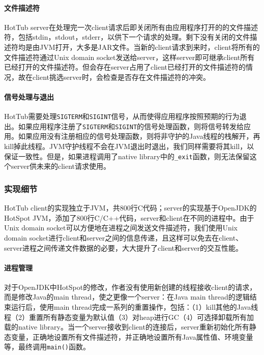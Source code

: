 \documentclass[lang=cn,12pt,a4paper,cite=authoryear]{elegantpaper}
\begin{document}
\begin{figure*}[!htp]
\paragraph{文件描述符}
HotTub server在处理完一次client请求后即关闭所有由应用程序打开的的文件描述符，包括stdin，stdout，stderr，以供下一个请求的处理。剩下没有关闭的文件描述符均是由JVM打开，大多是JAR文件。当新的client请求到来时，client将所有的文件描述符通过Unix domain socket发送给server，这样server即可继承client所有已经打开的文件描述符。但会存在server占用了client已经打开的文件描述符的情况，故在client挑选server时，会检查是否存在文件描述符的冲突。

\paragraph{信号处理与退出}
HotTub需要处理\texttt{SIGTERM}和\texttt{SIGINT}信号，从而使得应用程序按照预期的行为退出。如果应用程序注册了\texttt{SIGTERM}和\texttt{SIGINT}的信号处理函数，则将信号转发给应用。如果应用没有注册相应的信号处理函数，则将非守护的Java线程的栈解开，再kill掉此线程。JVM守护线程不会在JVM退出时退出，我们同样需要将其kill，以保证一致性。但是，如果进程调用了native library中的\texttt{\_exit}函数，则无法保留这个server供未来的client请求使用。

\subsubsection{实现细节}
HotTub client的实现独立于JVM，共800行C代码；server的实现基于OpenJDK的HotSpot JVM，添加了800行C/C++代码，server和client在不同的进程中。由于Unix domain socket可以方便地在进程之间发送文件描述符，我们使用Unix domain socket进行client和server之间的信息传递，且这样可以免去在client、server进程之间传递文件数据的必要，大大提升了client和server的交互性能。

\paragraph{进程管理} 对于OpenJDK中HotSpot的修改，作者没有使用新创建的线程接收client的请求，而是修改Java的main thread，使之更像一个server：在Java main thread的逻辑结束运行后，使用main thread完成一系列的重置操作，包括：（1）kill其他的Java线程（2）重置所有静态变量为默认值（3）对heap进行GC（4）可选择卸载所有加载的native library。当一个server接收到client的连接后，server重新初始化所有静态变量，正确地设置所有文件描述符，并正确地设置所有Java属性值、环境变量等，最终调用\texttt{main()}函数。


\end{figure*}
\end{document}

